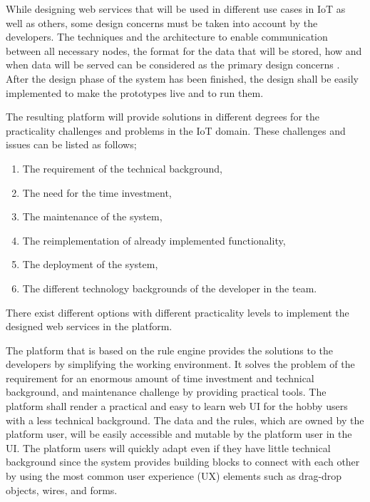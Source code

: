 While designing web services that will be used in different use cases in IoT as well as others, some design concerns must be taken into account by the developers. The techniques and the architecture to enable communication between all necessary nodes, the format for the data that will be stored, how and when data will be served can be considered as the primary design concerns \cite{6651222}. After the design phase of the system has been finished, the design shall be easily implemented to make the prototypes live and to run them. 

The resulting platform will provide solutions in different degrees for the practicality challenges and problems in the IoT domain. These challenges and issues can be listed as follows;

\begin{enumerate}
    \item The requirement of the technical background,
    \item The need for the time investment,
    \item The maintenance of the system,
    \item The reimplementation of already implemented functionality,
    \item The deployment of the system,
    \item The different technology backgrounds of the developer in the team.
\end{enumerate}

There exist different options with different practicality levels to implement the designed web services in the platform. 

The platform that is based on the rule engine provides the solutions to the developers by simplifying the working environment. It solves the problem of the requirement for an enormous amount of time investment and technical background, and maintenance challenge by providing practical tools. The platform shall render a practical and easy to learn web UI for the hobby users with a less technical background. The data and the rules, which are owned by the platform user, will be easily accessible and mutable by the platform user in the UI. The platform users will quickly adapt even if they have little technical background since the system provides building blocks to connect with each other by using the most common user experience (UX) elements such as drag-drop objects, wires, and forms. 

